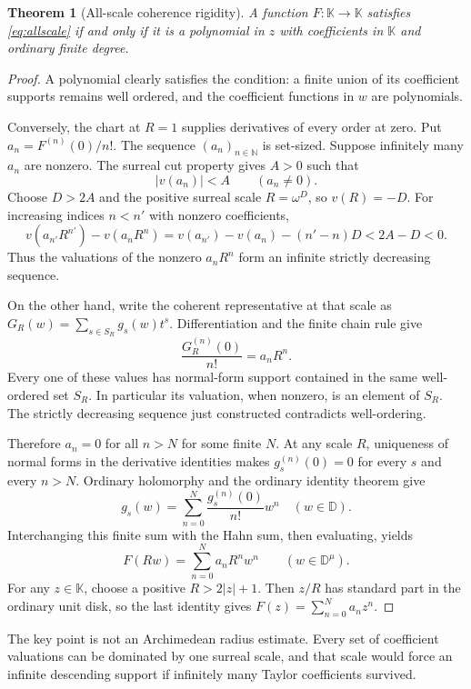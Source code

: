 \documentclass[11pt,oneside]{article}
\numberwithin{equation}{section}
\newtheorem{theorem}{Theorem}[section]
\theoremstyle{definition}
\theoremstyle{remark}\newtheorem{remark}[theorem]{Remark}
\newcommand{\K}{\mathbb K}
\newcommand{\N}{\mathbb N}
\newcommand{\Disk}{\mathbb D}
\begin{document}
\begin{theorem}[All-scale coherence rigidity]\label{thm:rigidity}
A function $F:\K\to\K$ satisfies \eqref{eq:allscale} if and only if
it is a polynomial in $z$ with coefficients in $\K$ and ordinary finite
degree.
\end{theorem}
\begin{proof}
A polynomial clearly satisfies the condition: a finite union of its
coefficient supports remains well ordered, and the coefficient functions
in $w$ are polynomials.

Conversely, the chart at $R=1$ supplies derivatives of every order at zero.
Put $a_n=F^{(n)}(0)/n!$. The sequence $(a_n)_{n\in\N}$ is set-sized.
Suppose infinitely many $a_n$ are nonzero. The surreal cut property gives
$A>0$ such that
\[
 |v(a_n)|<A\qquad(a_n\ne0).
\]
Choose $D>2A$ and the positive surreal scale $R=\omega^D$, so
$v(R)=-D$. For increasing indices $n<n'$ with nonzero coefficients,
\[
 v(a_{n'}R^{n'})-v(a_nR^n)
   =v(a_{n'})-v(a_n)-(n'-n)D<2A-D<0.
\]
Thus the valuations of the nonzero $a_nR^n$ form an infinite strictly
decreasing sequence.

On the other hand, write the coherent representative at that scale as
$G_R(w)=\sum_{s\in S_R}g_s(w)t^s$. Differentiation and the finite chain
rule give
\[
 \frac{G_R^{(n)}(0)}{n!}=a_nR^n.
\]
Every one of these values has normal-form support contained in the same
well-ordered set $S_R$. In particular its valuation, when nonzero, is
an element of $S_R$. The strictly decreasing sequence just constructed
contradicts well-ordering.

Therefore $a_n=0$ for all $n>N$ for some finite $N$. At any scale $R$,
uniqueness of normal forms in the derivative identities makes
$g_s^{(n)}(0)=0$ for every $s$ and every $n>N$. Ordinary holomorphy and
the ordinary identity theorem give
\[
 g_s(w)=\sum_{n=0}^N\frac{g_s^{(n)}(0)}{n!}w^n
 \quad(w\in\Disk).
\]
Interchanging this finite sum with the Hahn sum, then evaluating, yields
\[
 F(Rw)=\sum_{n=0}^N a_nR^nw^n\qquad(w\in\Disk^\mu).
\]
For any $z\in\K$, choose a positive $R>2|z|+1$. Then $z/R$ has standard
part in the ordinary unit disk, so the last identity gives
$F(z)=\sum_{n=0}^N a_nz^n$.
\end{proof}
The key point is not an Archimedean radius estimate. Every set of
coefficient valuations can be dominated by one surreal scale, and that
scale would force an infinite descending support if infinitely many
Taylor coefficients survived.
\end{document}
